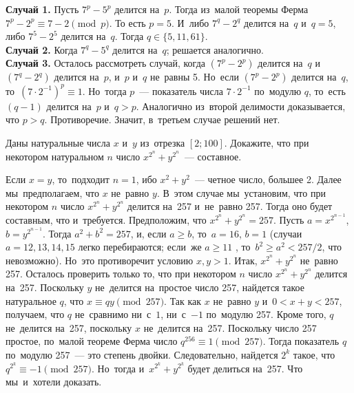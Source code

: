 \ifincludesolutions
\textbf{Случай 1.}
Пусть $7^p - 5^p$ делится на~$p$.
Тогда из~малой теоремы Ферма $7^p - 2^p \equiv 7 - 2 \pmod{p}$.
То есть $p = 5$.
И~либо $7^q - 2^q$ делится на~$q$ и~$q = 5$, либо $7^5 - 2^5$ делится на~$q$.
Тогда $q \in \{ 5, 11, 61 \}$. 
\\
\textbf{Случай 2.}
Когда $7^{q} - 5^{q}$ делится на~$q$; решается аналогично. 
\\
\textbf{Случай 3.}
Осталось рассмотреть случай, когда $(7^{p} - 2^{p})$ делится на~$q$
и~$(7^{q} - 2^{q})$ делится на~$p$, и~$p$ и~$q$ не~равны 5.
Но~если $(7^{p} - 2^{p})$ делится на~$q$, то~$(7 \cdot 2^{-1})^p \equiv 1$.
Но~тогда $p$~--- показатель числа $7 \cdot 2^{-1}$ по~модулю $q$, то~есть
$(q - 1)$ делится на~$p$ и~$q > p$.
Аналогично из~второй делимости доказывается, что $p > q$.
Противоречие.
Значит, в~третьем случае решений нет.
\fi %

\begin{problems}


\item
Даны натуральные числа $x$ и~$y$ из~отрезка $[2; 100]$.
Докажите, что при некотором натуральном  $n$ число $x^{2^n} + y^{2^n}$~---
составное. 

\end{problems}

\ifincludesolutions
Если $x = y$, то~подходит $n = 1$, ибо $x^2 + y^2$~--- четное число, большее 2.
Далее мы~предполагаем, что $x$ не~равно $y$.
В~этом случае мы~установим, что при некотором $n$ число $x^{2^n} + y^{2^n}$
делится на~257 и~не~равно 257.
Тогда оно будет составным, что и~требуется. 
Предположим, что $x^{2^n} +y ^{2^n} = 257$.
Пусть $a = x^{2^{n-1}}$, $b = y^{2^{n-1}}$.
Тогда $a^2 + b^2 = 257$, и, если $a \geq b$, то~$a = 16$, $b = 1$
(случаи $a = 12, 13, 14, 15$ легко перебираются;
если~же $a \geq 11$ , то~$b^2 \geq a^2 < 257 / 2$, что невозможно).
Но~это противоречит условию $x, y > 1$.
Итак, $x^{2^n} + y^{2^n}$ не~равно 257.
Осталось проверить только то, что при некотором $n$ число $x^{2^n} + y^{2^n}$
делится на~257. 
Поскольку $y$ не~делится на~простое число 257, найдется такое натуральное $q$,
что $x \equiv q y \pmod{257}$.
Так как $x$ не~равно $y$ и~$0 < x + y < 257$, получаем, что $q$ не~сравнимо
ни~с~$1$, ни~с~$-1$ по~модулю 257.
Кроме того, $q$ не~делится на~257, поскольку $x$ не~делится на~257.
Поскольку число 257 простое, по~малой теореме Ферма число
$q^{256} \equiv 1 \pmod{257}$.
Тогда показатель $q$ по~модулю 257~--- это степень двойки.
Следовательно, найдется $2^k$ такое, что $q^{2^k} \equiv -1 \pmod{257}$.
Но~тогда и~$x^{2^k} + y^{2^k}$ будет делиться на~257.
Что мы~и~хотели доказать. 
\fi %

\endgroup %

